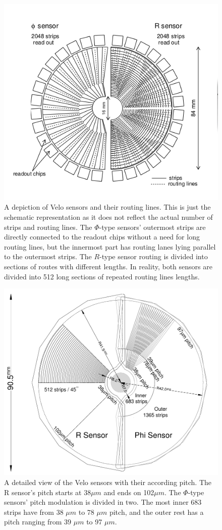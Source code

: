 \begin{figure}
  \centering
  \includegraphics[width=0.7\linewidth]{figures/chapter2/velo_module_routing.png}
  \caption{A depiction of Velo sensors and their routing lines.
    This is just the schematic representation as it does not reflect the actual number of strips and routing lines.
    The $\Phi$-type sensors' outermost strips are directly connected to the readout chips without a need for long routing lines, but the innermost part has routing lanes lying parallel to the outermost strips.
    The $R$-type sensor routing is divided into sections of routes with different lengths.
    In reality, both sensors are divided into 512 long sections of repeated routing lines lengths.
  }
  \label{fig:velo_routing}
\end{figure}

\begin{figure}
  \centering
  \includegraphics[width=0.7\linewidth]{figures/chapter2/velo_module_pitch.png}
  \caption{ A detailed view of the Velo sensors with their according pitch. The R sensor's pitch starts at 38$\mu m$ and ends on 102$\mu m$. The $\Phi$-type sensors' pitch modulation is divided in two. The most inner 683 strips have from 38 $\mu m$ to 78 $\mu m$ pitch, and the outer rest has a pitch ranging from 39 $\mu m$ to 97 $\mu m$. }
  \label{fig:velo_pitch}
\end{figure}


